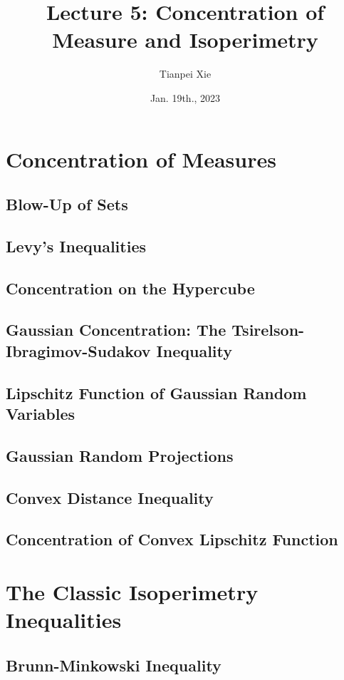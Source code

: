 \documentclass[11pt]{article}
\begin{document}
\title{Lecture 5: Concentration of Measure and Isoperimetry}
\author{ Tianpei Xie}
\date{Jan. 19th., 2023 }
\maketitle
\tableofcontents
\newpage
\section{Concentration of Measures}
\subsection{Blow-Up of Sets}
\subsection{Levy's Inequalities}
\subsection{Concentration on the Hypercube}
\subsection{Gaussian Concentration: The Tsirelson-Ibragimov-Sudakov Inequality}
\subsection{Lipschitz Function of Gaussian Random Variables}
\subsection{Gaussian Random Projections}
\subsection{Convex Distance Inequality}
\subsection{Concentration of Convex Lipschitz Function}


\section{The Classic Isoperimetry Inequalities}
\subsection{Brunn-Minkowski Inequality}
\end{document}
